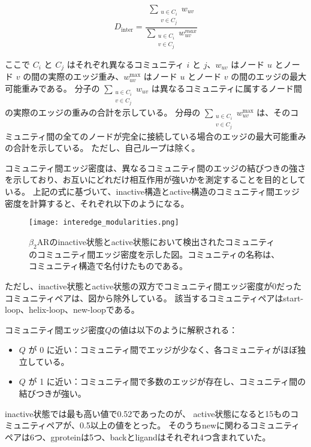 \begin{equation}
D_{\text{inter}} = \frac{\sum_{\substack{u \in C_i \\ v \in C_j}} w_{uv}}{\sum_{\substack{u \in C_i \\ v \in C_j}} w_{uv}^{max}}
\label{eq:inter_density}
\end{equation}

ここで $C_i$ と $C_j$ はそれぞれ異なるコミュニティ $i$ と $j$、$w_{uv}$ はノード $u$ とノード $v$ の間の実際のエッジ重み、$w_{uv}^{\text{max}}$ はノード $u$ とノード $v$ の間のエッジの最大可能重みである。
分子の $\sum\limits_{\substack{u \in C_i \\ v \in C_j}} w_{uv}$ は異なるコミュニティに属するノード間の実際のエッジの重みの合計を示している。
分母の $\sum\limits_{\substack{u \in C_i \\ v \in C_j}} w_{uv}^{\text{max}}$ は、そのコミュニティ間の全てのノードが完全に接続している場合のエッジの最大可能重みの合計を示している。
ただし、自己ループは除く。

コミュニティ間エッジ密度は、異なるコミュニティ間のエッジの結びつきの強さを示しており、お互いにどれだけ相互作用が強いかを測定することを目的としている。
上記の式に基づいて、inactive構造とactive構造のコミュニティ間エッジ密度を計算すると、それぞれ以下のようになる。

\begin{figure}[htbp]
    \centering
    \texttt{[image: interedge\_modularities.png]}
    \caption{$\beta_2$ARのinactive状態とactive状態において検出されたコミュニティのコミュニティ間エッジ密度を示した図。コミュニティの名称は、コミュニティ構造で名付けたものである。}
    \label{fig:inter}
\end{figure}

\newpage

ただし、inactive状態とactive状態の双方でコミュニティ間エッジ密度が0だったコミュニティペアは、図から除外している。
該当するコミュニティペアはstart-loop、helix-loop、new-loopである。

コミュニティ間エッジ密度$Q$の値は以下のように解釈される：
\begin{itemize}
    \item \( Q \) が 0 に近い：コミュニティ間でエッジが少なく、各コミュニティがほぼ独立している。
    \item \( Q \) が 1 に近い：コミュニティ間で多数のエッジが存在し、コミュニティ間の結びつきが強い。
\end{itemize}

inactive状態では最も高い値で0.52であったのが、
active状態になると15ものコミュニティペアが、0.5以上の値をとった。
そのうちnewに関わるコミュニティペアは6つ、gproteinは5つ、backとligandはそれぞれ4つ含まれていた。

